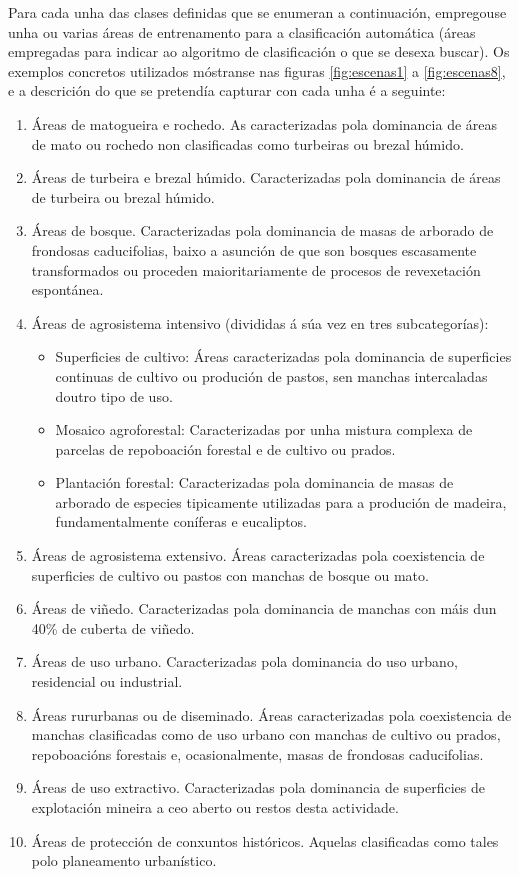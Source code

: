\documentclass[11pt,a4paper]{article}
\begin{document}
Para cada unha das clases definidas que se enumeran a continuación, empregouse unha ou varias áreas de entrenamento para a clasificación automática (áreas empregadas para indicar ao algoritmo de clasificación o que se desexa buscar). Os exemplos concretos utilizados móstranse nas figuras \ref{fig:escenas1} a \ref{fig:escenas8}, e a descrición do que se pretendía capturar con cada unha é a seguinte:

\begin{enumerate}
 \item Áreas de matogueira e rochedo. As caracterizadas pola dominancia de áreas de mato ou rochedo non clasificadas como turbeiras ou brezal húmido.
 \item Áreas de turbeira e brezal húmido. Caracterizadas pola dominancia de áreas de turbeira ou brezal húmido.
 \item Áreas de bosque. Caracterizadas pola dominancia de masas de arborado de frondosas caducifolias, baixo a asunción de que son bosques escasamente transformados ou proceden maioritariamente de procesos de revexetación espontánea.
 \item Áreas de agrosistema intensivo (divididas á súa vez en tres subcategorías):
 \begin{itemize}
  \item Superficies de cultivo: Áreas caracterizadas pola dominancia de superficies continuas de cultivo ou produción de pastos, sen manchas intercaladas doutro tipo de uso.
  \item Mosaico agroforestal: Caracterizadas por unha mistura complexa de parcelas de repoboación forestal e de cultivo ou prados.
  \item Plantación forestal: Caracterizadas pola dominancia de masas de arborado de especies tipicamente utilizadas para a produción de madeira, fundamentalmente coníferas e eucaliptos.
 \end{itemize}
 \item Áreas de agrosistema extensivo. Áreas caracterizadas pola coexistencia de superficies de cultivo ou pastos con manchas de bosque ou mato.
 \item Áreas de viñedo. Caracterizadas pola dominancia de manchas con máis dun 40\% de cuberta de viñedo.
 \item Áreas de uso urbano. Caracterizadas pola dominancia do uso urbano, residencial ou industrial.
 \item Áreas rururbanas ou de diseminado. Áreas caracterizadas pola coexistencia de manchas clasificadas como de uso urbano con manchas de cultivo ou prados, repoboacións forestais e, ocasionalmente, masas de frondosas caducifolias.
 \item Áreas de uso extractivo. Caracterizadas pola dominancia de superficies de explotación mineira a ceo aberto ou restos desta actividade.
 \item Áreas de protección de conxuntos históricos. Aquelas clasificadas como tales polo planeamento urbanístico.
\end{enumerate}
\end{document}
